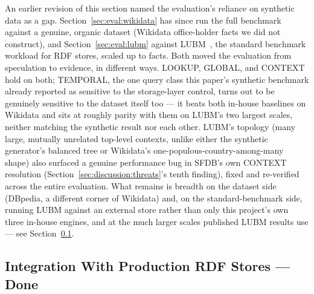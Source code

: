An earlier revision of this section named the evaluation's reliance on
synthetic data as a gap. Section~\ref{sec:eval:wikidata} has since run
the full benchmark against a genuine, organic dataset (Wikidata
office-holder facts we did not construct), and
Section~\ref{sec:eval:lubm} against LUBM~\cite{guo2005lubm}, the
standard benchmark workload for RDF stores, scaled up to
\lubmlargescale{} facts. Both moved the evaluation from
speculation to evidence, in different ways. LOOKUP, GLOBAL, and CONTEXT
hold on both; TEMPORAL, the one query class this paper's synthetic
benchmark already reported as sensitive to the storage-layer control, turns
out to be genuinely sensitive to the dataset itself too --- it beats
both in-house baselines on Wikidata and sits at roughly parity with
them on LUBM's two largest scales, neither matching the synthetic
result nor each other. LUBM's topology (many large, mutually unrelated
top-level contexts, unlike either the synthetic generator's balanced
tree or Wikidata's one-populous-country-among-many shape) also surfaced
a genuine performance bug in SFDB's own CONTEXT resolution
(Section~\ref{sec:discussion:threats}'s tenth finding), fixed and
re-verified across the entire evaluation. What remains is breadth on
the dataset side (DBpedia, a different corner of Wikidata) and, on the
standard-benchmark side, running LUBM against an external store rather
than only this project's own three in-house engines, and at the much
larger scales published LUBM results use --- see
Section~\ref{sec:future:jena}.

\subsection{Integration With Production RDF Stores --- Done}
\label{sec:future:jena}


